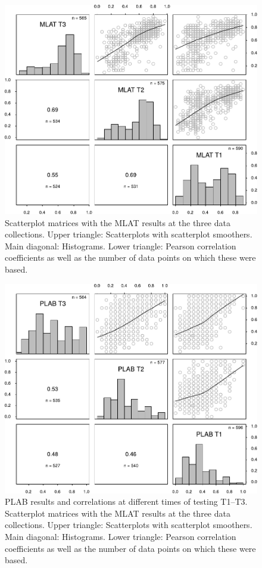 \documentclass[output=paper]{langsci/langscibook}
\begin{document}
\begin{figure}
\includegraphics[width=\textwidth]{figures/figure10.1.pdf}
\caption{\label{fig:10:1}Scatterplot matrices with the MLAT results at the three data collections. Upper triangle: Scatterplots with scatterplot smoothers. Main diagonal: Histograms. Lower triangle: Pearson correlation coefficients as well as the number of data points on which these were based.}
\end{figure}

  
\begin{figure}
\includegraphics[width=\textwidth]{figures/figure10.2.pdf}
\caption{\label{fig:10:2}PLAB results and correlations at different times of testing T1--T3. Scatterplot matrices with the MLAT results at the three data collections. Upper triangle: Scatterplots with scatterplot smoothers. Main diagonal: Histograms. Lower triangle: Pearson correlation coefficients as well as the number of data points on which these were based.}
\end{figure}
\end{document}
